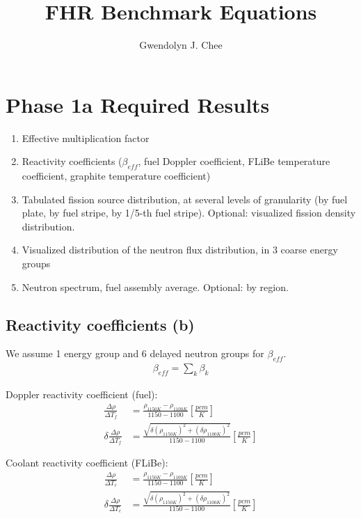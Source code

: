 \documentclass[letterpaper,11pt]{article}
\author{Gwendolyn J. Chee}
\title{FHR Benchmark Equations }
\begin{document}
\maketitle
\hrulefill
\onehalfspacing

\section{Phase 1a Required Results}
\begin{enumerate}[label=(\alph*)]
    \item Effective multiplication factor 
    \item Reactivity coefficients ($\beta_{eff}$, fuel Doppler coefficient, FLiBe 
    temperature coefficient, graphite temperature coefficient)
    \item Tabulated fission source distribution, at several levels of granularity 
    (by fuel plate, by fuel stripe, by 1/5-th fuel stripe). Optional: visualized fission 
    density distribution.
    \item Visualized distribution of the neutron flux distribution, in 3 coarse energy groups
    \item Neutron spectrum, fuel assembly average. Optional: by region.
\end{enumerate}

\subsection{Reactivity coefficients (b)}
We assume 1 energy group and 6 delayed neutron groups for $\beta_{eff}$. 
\begin{align*}
    \beta_{eff} = \sum_k \beta_k
\end{align*}

Doppler reactivity coefficient (fuel): 
\begin{align*}
    \frac{\Delta \rho}{\Delta T_f} &= 
    \frac{\rho_{1150K}-\rho_{1100K}}{1150-1100} [\frac{pcm}{K}] \\
    \delta \frac{\Delta \rho}{\Delta T_f} &= 
    \frac{\sqrt{\delta (\rho_{1150K})^2+(\delta \rho_{1100K})^2}}{1150-1100} [\frac{pcm}{K}] 
\end{align*}

Coolant reactivity coefficient (FLiBe): 
\begin{align*}
    \frac{\Delta \rho}{\Delta T_c} &= 
    \frac{\rho_{1150K}-\rho_{1100K}}{1150-1100} [\frac{pcm}{K}] \\
    \delta \frac{\Delta \rho}{\Delta T_c} &= 
    \frac{\sqrt{\delta (\rho_{1150K})^2+(\delta \rho_{1100K})^2}}{1150-1100} [\frac{pcm}{K}] 
\end{align*}
\end{document}
